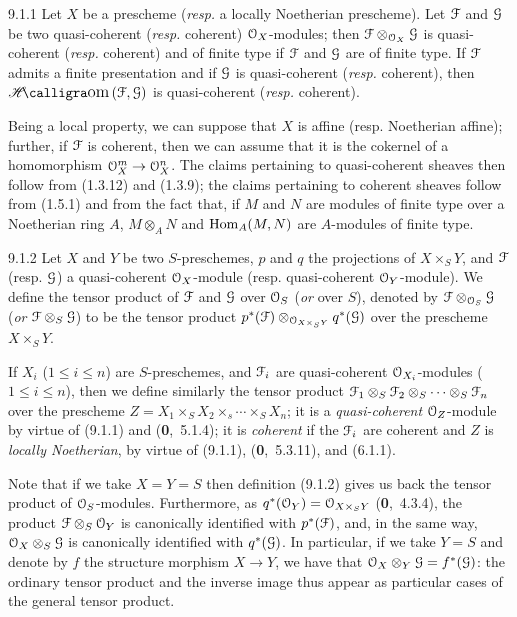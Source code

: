 \documentclass[../main.tex]{subfiles}
\begin{document}
\begin{cx}[Proposition]{9.1.1}
    Let $X$ be a prescheme (\emph{resp.} a locally Noetherian prescheme).
    Let $\mathcal{F}$ and $\mathcal{G}$ be two quasi-coherent (\emph{resp.} coherent) $\mathcal{O}_X$-modules; then $\mathcal{F}\otimes_{\mathcal{O}_X}\mathcal{G}$ is quasi-coherent (\emph{resp.} coherent) and of finite type if $\mathcal{F}$ and $\mathcal{G}$ are of finite type.
    If $\mathcal{F}$ admits a finite presentation and if $\mathcal{G}$ is quasi-coherent (\emph{resp.} coherent), then $\sheafHom(\sheaf{F},\sheaf{G})$ is quasi-coherent (\emph{resp.} coherent).
\end{cx}

Being a local property, we can suppose that $X$ is affine (resp. Noetherian affine); further, if $\mathcal{F}$ is coherent, then we can assume that it is the cokernel of a homomorphism $\mathcal{O}_X^m\to\mathcal{O}_X^n$.
The claims pertaining to quasi-coherent sheaves then follow from (1.3.12) and (1.3.9); the claims pertaining to coherent sheaves follow from (1.5.1) and from the fact that, if $M$ and $N$ are modules of finite type over a Noetherian ring $A$, $M\otimes_A N$ and $\operatorname{Hom}_A(M,N)$ are $A$-modules of finite type.

\begin{cx}[Definition]{9.1.2}
    Let $X$ and $Y$ be two $S$-preschemes, $p$ and $q$ the projections of $X\times_S Y$, and $\mathcal{F}$ (resp. $\mathcal{G}$) a quasi-coherent $\mathcal{O}_X$-module (resp. quasi-coherent $\mathcal{O}_Y$-module).
    We define the tensor product of $\mathcal{F}$ and $\mathcal{G}$ over $\mathcal{O}_S$ (\emph{or} over $S$), denoted by $\mathcal{F}\otimes_{\mathcal{O}_S}\mathcal{G}$ (\emph{or} $\mathcal{F}\otimes_S\mathcal{G}$) to be the tensor product $p^*(\mathcal{F})\otimes_{\mathcal{O}_{X\times_S Y}}q^*(\mathcal{G})$ over the prescheme $X\times_S Y$.
\end{cx}


If $X_i$ ($1\leqslant i\leqslant n$) are $S$-preschemes, and $\mathcal{F}_i$ are quasi-coherent $\mathcal{O}_{X_i}$-modules ($1\leqslant i\leqslant n$), then we define similarly the tensor product $\mathcal{F}_1\otimes_S\mathcal{F}_2\otimes_S\cdots\otimes_S\mathcal{F}_n$ over the prescheme $Z=X_1\times_S X_2\times_s\cdots\times_S X_n$; it is a \emph{quasi-coherent} $\mathcal{O}_Z$-module by virtue of (9.1.1) and (\textbf{0},~5.1.4); it is \emph{coherent} if the $\mathcal{F}_i$ are coherent and $Z$ is \emph{locally Noetherian}, by virtue of (9.1.1), (\textbf{0},~5.3.11), and (6.1.1).

Note that if we take $X=Y=S$ then definition (9.1.2) gives us back the tensor product of $\mathcal{O}_S$-modules.
Furthermore, as $q^*(\mathcal{O}_Y)=\mathcal{O}_{X\times_S Y}$ (\textbf{0},~4.3.4), the product $\mathcal{F}\otimes_S\mathcal{O}_Y$ is canonically identified with $p^*(\mathcal{F})$, and, in the same way, $\mathcal{O}_X\otimes_S\mathcal{G}$ is canonically identified with $q^*(\mathcal{G})$.
In particular, if we take $Y=S$ and denote by $f$ the structure morphism $X\to Y$, we have that $\mathcal{O}_X\otimes_Y\mathcal{G}=f^*(\mathcal{G})$: the ordinary tensor product and the inverse image thus appear as particular cases of the general tensor product.
\end{document}
